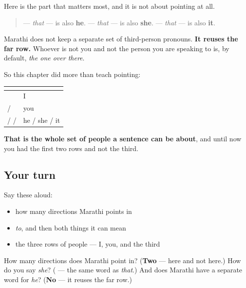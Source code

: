 \begin{grammarlens}[title={Grammar Lens: the far row is also he, she and it}]
Here is the part that matters most, and it is not about pointing at all.

\begin{quote}
\textbf{} — \emph{that} — is also \textbf{he}. \textbf{} — \emph{that} — is also \textbf{she}. \textbf{} — \emph{that} — is also \textbf{it}.
\end{quote}

Marathi does not keep a separate set of third-person pronouns. \textbf{It reuses the far row.} Whoever is not you and not the person you are speaking to is, by default, \emph{the one over there}.

So this chapter did more than teach pointing:

\noindent
\begin{tabularx}{\linewidth}{@{}>{\raggedright\arraybackslash}X>{\raggedright\arraybackslash}X@{}}
\toprule
\textbf{} & \textbf{} \\
\midrule
\textbf{\mr{मी}} & I \\
\textbf{\mr{तू}} / \textbf{\mr{तुम्ही}} & you \\
\textbf{\mr{तो}} / \textbf{\mr{ती}} / \textbf{\mr{ते}} & he / she / it \\
\bottomrule
\end{tabularx}

\textbf{That is the whole set of people a sentence can be about}, and until now you had the first two rows and not the third.
\end{grammarlens}

\subsection*{Your turn}
Say these aloud:

\begin{itemize}
\raggedright
  \item how many directions Marathi points in
  \item \emph{to}, and then both things it can mean
  \item the three rows of people — I, you, and the third
\end{itemize}

\begin{tcolorbox}[breakable,colback=teal!4,colframe=teal!35!black,title={Before you move on}]
How many directions does Marathi point in? (\textbf{Two} — here and not here.) How do you say \emph{she}? (\emph{\textbf{}} — the same word as \emph{that}.) And does Marathi have a separate word for \emph{he}? (\textbf{No} — it reuses the far row.)
\end{tcolorbox}

